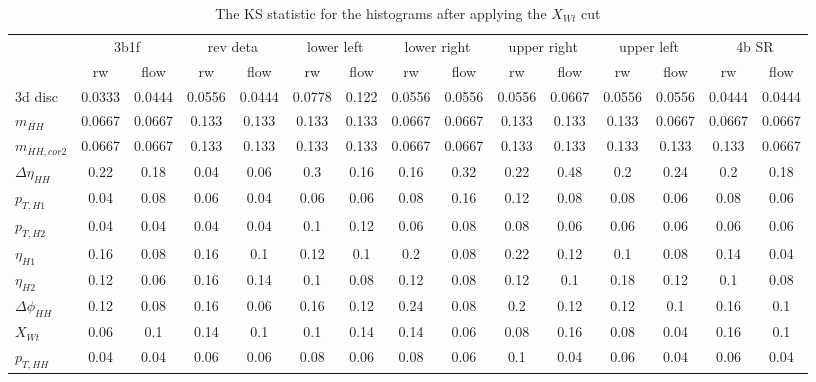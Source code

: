 \begin{table}
\centering\begin{adjustbox}{width=\columnwidth,center}
\label{tab:ks_Xwt_cut}
\begin{tabular}{lcccccccccccccc}
\toprule
{} & \multicolumn{2}{c}{3b1f} & \multicolumn{2}{c}{rev deta} & \multicolumn{2}{c}{lower left} & \multicolumn{2}{c}{lower right} & \multicolumn{2}{c}{upper right} & \multicolumn{2}{c}{upper left} & \multicolumn{2}{c}{4b SR} \\
{} &     rw &   flow &       rw &   flow &         rw &  flow &          rw &   flow &          rw &   flow &         rw &   flow &     rw &   flow \\
\midrule
3d disc            & 0.0333 & 0.0444 &   0.0556 & 0.0444 &     0.0778 & 0.122 &      0.0556 & 0.0556 &      0.0556 & 0.0667 &     0.0556 & 0.0556 & 0.0444 & 0.0444 \\
$m_{HH}$           & 0.0667 & 0.0667 &    0.133 &  0.133 &      0.133 & 0.133 &      0.0667 & 0.0667 &       0.133 &  0.133 &      0.133 & 0.0667 & 0.0667 & 0.0667 \\
$m_{HH,cor2}$      & 0.0667 & 0.0667 &    0.133 &  0.133 &      0.133 & 0.133 &      0.0667 & 0.0667 &       0.133 &  0.133 &      0.133 &  0.133 &  0.133 & 0.0667 \\
$\Delta \eta_{HH}$ &   0.22 &   0.18 &     0.04 &   0.06 &        0.3 &  0.16 &        0.16 &   0.32 &        0.22 &   0.48 &        0.2 &   0.24 &    0.2 &   0.18 \\
$p_{T,H1}$         &   0.04 &   0.08 &     0.06 &   0.04 &       0.06 &  0.06 &        0.08 &   0.16 &        0.12 &   0.08 &       0.08 &   0.06 &   0.08 &   0.06 \\
$p_{T,H2}$         &   0.04 &   0.04 &     0.04 &   0.04 &        0.1 &  0.12 &        0.06 &   0.08 &        0.08 &   0.06 &       0.06 &   0.06 &   0.06 &   0.06 \\
$\eta_{H1}$        &   0.16 &   0.08 &     0.16 &    0.1 &       0.12 &   0.1 &         0.2 &   0.08 &        0.22 &   0.12 &        0.1 &   0.08 &   0.14 &   0.04 \\
$\eta_{H2}$        &   0.12 &   0.06 &     0.16 &   0.14 &        0.1 &  0.08 &        0.12 &   0.08 &        0.12 &    0.1 &       0.18 &   0.12 &    0.1 &   0.08 \\
$\Delta \phi_{HH}$ &   0.12 &   0.08 &     0.16 &   0.06 &       0.16 &  0.12 &        0.24 &   0.08 &         0.2 &   0.12 &       0.12 &    0.1 &   0.16 &    0.1 \\
$X_{Wt}$           &   0.06 &    0.1 &     0.14 &    0.1 &        0.1 &  0.14 &        0.14 &   0.06 &        0.08 &   0.16 &       0.08 &   0.04 &   0.16 &    0.1 \\
$p_{T,HH}$         &   0.04 &   0.04 &     0.06 &   0.06 &       0.08 &  0.06 &        0.08 &   0.06 &         0.1 &   0.04 &       0.06 &   0.04 &   0.06 &   0.04 \\
\bottomrule
\end{tabular}
\end{adjustbox}\caption{The KS statistic for the histograms after applying the $X_{Wt}$ cut}\end{table}
